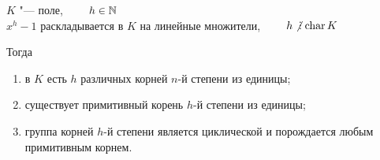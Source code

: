 \begin{theorem}
	$ K $ "--- поле, $ \qquad h \in \mathbb{N} $ \\
	$ x^h - 1 $ раскладывается в $ K $ на линейные множители, $ \qquad h \ndivby \chara K $

	Тогда
	\begin{enumerate}
		\item в $ K $ есть $ h $ различных корней $ n $-й степени из единицы;
		\item существует примитивный корень $ h $-й степени из единицы;
		\item группа корней $ h $-й степени является циклической и порождается любым примитивным корнем.
	\end{enumerate}
\end{theorem}

